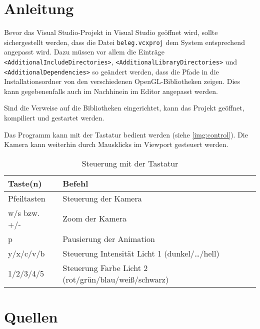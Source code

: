 \documentclass{scrreprt}
\begin{document}
\chapter{Anleitung}
Bevor das Visual Studio-Projekt in Visual Studio geöffnet wird, sollte sichergestellt werden, dass die Datei \lstinline`beleg.vcxproj` dem System entsprechend angepasst wird. Dazu müssen vor allem die Einträge \lstinline`<AdditionalIncludeDirectories>`, \lstinline`<AdditionalLibraryDirectories>` und \lstinline`<AdditionalDependencies>` so geändert werden, dass die Pfade in die Installationsordner von den verschiedenen OpenGL-Bibliotheken zeigen. Dies kann gegebenenfalls auch im Nachhinein im Editor angepasst werden.

Sind die Verweise auf die Bibliotheken eingerichtet, kann das Projekt geöffnet, kompiliert und gestartet werden.

Das Programm kann mit der Tastatur bedient werden (siehe \autoref{img:control}). Die Kamera kann weiterhin durch Mausklicks im Viewport gesteuert werden.
\begin{table}[!ht]
\centering
\begin{tabular}{l | l}
Taste(n) & Befehl\\\hline
Pfeiltasten & Steuerung der Kamera\\
w/s bzw. +/- & Zoom der Kamera\\
p & Pausierung der Animation\\
y/x/c/v/b & Steuerung Intensität Licht 1 (dunkel/…/hell)\\
1/2/3/4/5 & Steuerung Farbe Licht 2 (rot/grün/blau/weiß/schwarz)\\
\end{tabular}
\caption{Steuerung mit der Tastatur}
\label{img:control}
\end{table}
\chapter*{Quellen}
\renewcommand{\emph}[1]{\textit{#1}}
\printbibliography[heading=none]
\clearpage
\listoffigures
\end{document}
